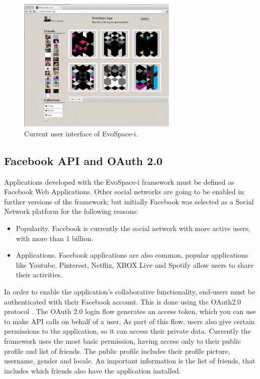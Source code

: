 \documentclass{sig-alternate}
\begin{document}
\begin{figure}[!t]
    \centering
        \includegraphics[width=3in]{EvoApp.eps}
    \caption{Current user interface of EvoSpace-i.}
    \label{fig:web}
\end{figure}

\subsection{Facebook API and OAuth 2.0}
Applications developed with the EvoSpace-i framework must be defined as Facebook Web Applications. Other social networks are going to be enabled in further versions of the framework; but initially Facebook was selected as a Social Network platform for the following reasons:
\begin{itemize}
	\item Popularity. Facebook is currently the social network with more active users, with more than 1 billion.

	\item Applications. Facebook applications are also common, popular applications like Youtube, Pinterest, Netflix, XBOX Live and Spotify allow users to share their activities.	
\end{itemize}
In order to enable the application's collaborative functionality, end-users must be authenticated with their Facebook account. This is done using the OAuth2.0 protocol \cite{hammer2011oauth}. The OAuth 2.0 login flow generates an access token, which you can use to make API calls on behalf of a user. As part of this flow, users also give certain permissions to the application, so it can access their private data. Currently the framework uses the most basic permission, having access only to their public profile and list of friends. The public profile includes their profile picture, username, gender and locale. An important information is the list of friends, that includes which friends also have the application installed.
\end{document}
